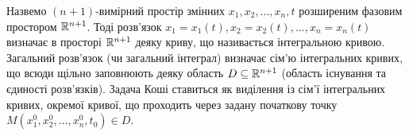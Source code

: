Назвемо $(n+1)$-вимірний простір змінних $x_1, x_2, \ldots, x_n, t$ розширеним фазовим простором $\mathbb{R}^{n + 1}$. Тоді розв’язок $x_1 = x_1(t), x_2 = x_2(t), \ldots, x_n = x_n(t)$ визначає в просторі $\mathbb{R}^{n + 1}$ деяку криву, що називається інтегральною кривою. Загальний розв’язок (чи загальний інтеграл) визначає сім’ю інтегральних кривих, що всюди щільно заповнюють деяку область $D \subseteq \mathbb{R}^{n + 1}$  (область існування та єдиності розв’язків). Задача Коші ставиться як виділення із сім’ї інтегральних кривих, окремої кривої, що проходить через задану початкову точку $M \left(x_1^0, x_2^0, \ldots, x_n^0, t_0\right) \in D$.